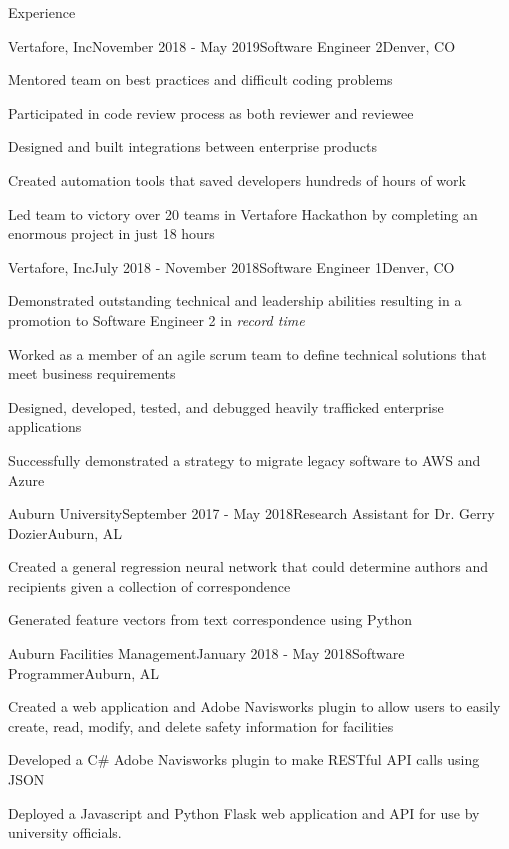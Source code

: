 \documentclass{resume} %
\begin{document}
\begin{rSection}{Experience}

\begin{rSubsection}{Vertafore, Inc}{November 2018 - May 2019}{Software Engineer 2}{Denver, CO}
\item Mentored team on best practices and difficult coding problems
\item Participated in code review process as both reviewer and reviewee 
\item Designed and built integrations between enterprise products
\item Created automation tools that saved developers hundreds of hours of work
\item Led team to victory over 20 teams in Vertafore Hackathon by completing an enormous project in just 18 hours
\end{rSubsection}

\begin{rSubsection}{Vertafore, Inc}{July 2018 - November 2018}{Software Engineer 1}{Denver, CO}
\item Demonstrated outstanding technical and leadership abilities resulting in a promotion to Software Engineer 2 in \textit{record time}
\item Worked as a member of an agile scrum team to define technical solutions that meet business requirements
\item Designed, developed, tested, and debugged heavily trafficked enterprise applications
\item Successfully demonstrated a strategy to migrate legacy software to AWS and Azure
\end{rSubsection}


\begin{rSubsection}{Auburn University}{September 2017 - May 2018}{Research Assistant for Dr. Gerry Dozier}{Auburn, AL}
\item Created a general regression neural network that could determine authors and recipients given a collection of correspondence
\item Generated feature vectors from text correspondence using Python
\end{rSubsection}


\begin{rSubsection}{Auburn Facilities Management}{January 2018 - May 2018}{Software Programmer}{Auburn, AL}
\item Created a web application and Adobe Navisworks plugin to allow users to easily create, read, modify, and delete safety information for facilities
\item Developed a C\# Adobe Navisworks plugin to make RESTful API calls using JSON
\item Deployed a Javascript and Python Flask web application and API for use by university officials.
\end{rSubsection}

\end{rSection}
\end{document}
